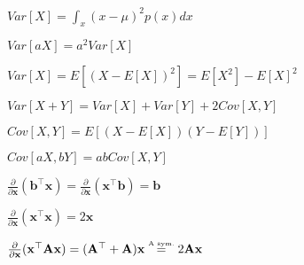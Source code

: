\begin{inparaitem}[\color{red}\textbullet]
\item $Var[X]=\int_x(x-\mu)^2p(x) dx$\\
\item $Var[aX]=a^2Var[X]$\\
\item $Var[X]=E[(X-E[X])^2]=E[X^2]-E[X]^2$ \\
\item $Var[X{+}Y]=Var[X]{+}Var[Y]{+}2Cov[X,Y]$ \\
\item $Cov[X,Y] = E[(X - E[X])(Y - E[Y])]$ \\
\item $Cov[aX,bY]{=}abCov[X,Y]$
	\item $\frac{\partial}{\partial \mathbf{x}}(\mathbf{b}^\top \mathbf{x}) = \frac{\partial}{\partial \mathbf{x}}(\mathbf{x}^\top \mathbf{b}) = \mathbf{b}$
	\item $\frac{\partial}{\partial \mathbf{x}}(\mathbf{x}^\top \mathbf{x}) = 2\mathbf{x}$ \\
	\item $\frac{\partial}{\partial \mathbf{x}}(\mathbf{x}^\top \mathbf{A}\mathbf{x}) = (\mathbf{A}^\top + \mathbf{A})\mathbf{x} \stackrel{\text{\tiny A sym.}}{=} 2\mathbf{A}\mathbf{x}$ \\

\end{inparaitem}

